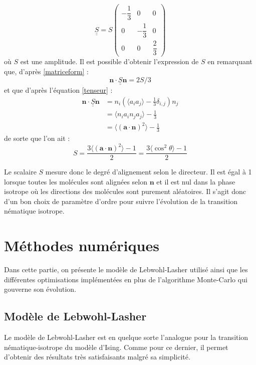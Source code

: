 \documentclass[11pt,a4paper]{article}
\numberwithin{equation}{section}
\begin{document}
\begin{equation}
\underline{\underline{S}} = S
\begin{pmatrix}
 -\dfrac{1}{3} & 0  & 0\\
 0 & -\dfrac{1}{3} &0 \\
 0 &0 & \dfrac{2}{3}
 \end{pmatrix} 
 \label{matriceform}
\end{equation}
où $S$ est une amplitude. Il est possible d'obtenir l'expression de $S$ en remarquant que, d'après \ref{matriceform} :
\begin{equation*}
 \bm{n} \cdot \underline{\underline{S}} \bm{n} = 2S/3
\end{equation*} 
et que d'après l'équation \ref{tenseur} :
\begin{align*}
 \bm{n} \cdot \underline{\underline{S}} \bm{n} & = n_i\left(\langle a_i a_j \rangle-\frac{1}{3} \delta_{i,j} \right )n_j\\ 
 & = \langle n_ia_in_ja_j \rangle -\frac{1}{3}\\
 & = \langle (\bm{a}\cdot \bm{n})^2 \rangle - \frac{1}{3}
\end{align*}
de sorte que l'on ait :
\begin{equation}
S = \frac{3 \langle (\bm{a}\cdot \bm{n})^2\rangle -1}{2} = \frac{3 \langle \cos^2 \theta \rangle -1}{2}
\end{equation}

Le scalaire $S$ mesure donc le degré d'alignement selon le directeur. Il est égal à 1 lorsque toutes les molécules sont alignées selon $\bm{n}$ et il est nul dans la phase isotrope où les directions des molécules sont purement aléatoires. Il s'agit donc d'un bon choix de paramètre d'ordre pour suivre l'évolution de la transition nématique isotrope.
\newpage
\section{Méthodes numériques}
Dans cette partie, on présente le modèle de Lebwohl-Lasher utilisé ainsi que les différentes optimisations implémentées en plus de l'algorithme Monte-Carlo qui gouverne son évolution.

\subsection{Modèle de Lebwohl-Lasher}
\label{lebwohlpart}
Le modèle de Lebwohl-Lasher \cite{model} est en quelque sorte l'analogue pour la transition nématique-isotrope du modèle d'Ising. Comme pour ce dernier, il permet d'obtenir des résultats très satisfaisants malgré sa simplicité.\medskip
\end{document}
